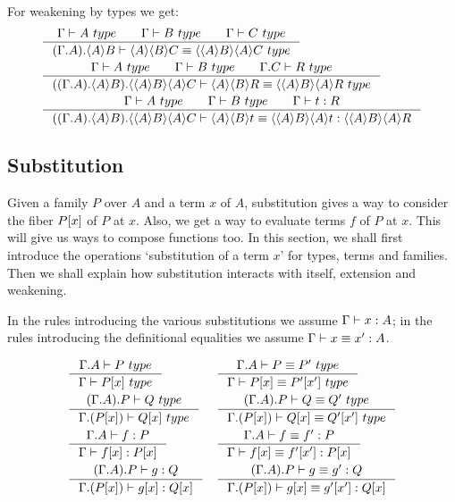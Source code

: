 For weakening by types we get:
\begin{align}
& \inference{\jtype{\Gamma}{A}\qquad\jtype{\Gamma}{B}\qquad\jtype{\Gamma}{C}}
          {\jtypeeq{\ctxext{{\Gamma}{A}}{\ctxwk{A}{B}}}{\ctxwk{A}{{B}{C}}}
            {\ctxwk{{A}{B}}{{A}{C}}}}\\
& \inference{\jtype{\Gamma}{A}\qquad\jtype{\Gamma}{B}\qquad\jtype{\ctxext{\Gamma}{C}}{R}}
          {\jtypeeq{\ctxext{{{\Gamma}{A}}{\ctxwk{A}{B}}}{\ctxwk{{A}{B}}{{A}{C}}}}
            {\ctxwk{A}{{B}{R}}}
            {\ctxwk{{A}{B}}{{A}{R}}}}\\
& \inference{\jtype{\Gamma}{A}\qquad\jtype{\Gamma}{B}\qquad\jterm{\Gamma}{R}{t}}
          {\jtermeq{\ctxext{{{\Gamma}{A}}{\ctxwk{A}{B}}}{\ctxwk{{A}{B}}{{A}{C}}}}
            {\ctxwk{{A}{B}}{{A}{R}}}{\ctxwk{A}{{B}{t}}}{\ctxwk{{A}{B}}{{A}{t}}}}
\end{align}

\subsection{Substitution}
Given a family $P$ over $A$ and a term $x$ of $A$, substitution gives a way to
consider the fiber $\subst{x}{P}$ of $P$ at $x$. Also, we get a way to evaluate
terms $f$ of $P$ at $x$. This will give us ways to compose functions too. In
this section, we shall first introduce the operations `substitution of a term $x$'
for types, terms and families. Then we shall explain how substitution interacts
with itself, extension and weakening.

In the rules introducing the various substitutions we assume $\jterm{\Gamma}{A}{x}$;
in the rules introducing the definitional equalities we assume $\jtermeq{\Gamma}{A}{x}{x'}$.

\begin{align}
& \inference{\jtype{\ctxext{\Gamma}{A}}{P}}{\jtype{\Gamma}{\subst{x}{P}}}
& & \inference{\jtypeeq{\ctxext{\Gamma}{A}}{P}{P'}}{\jtypeeq{\Gamma}{\subst{x}{P}}{\subst{x'}{P'}}}\\
& \inference{\jtype{\ctxext{{\Gamma}{A}}{P}}{Q}}{\jtype{\ctxext{\Gamma}{\subst{x}{P}}}{\subst{x}{Q}}}
& & \inference{\jtypeeq{\ctxext{{\Gamma}{A}}{P}}{Q}{Q'}}{\jtypeeq{\ctxext{\Gamma}{\subst{x}{P}}}{\subst{x}{Q}}{\subst{x'}{Q'}}}\\
& \inference{\jterm{\ctxext{\Gamma}{A}}{P}{f}}{\jterm{\Gamma}{\subst{x}{P}}{\subst{x}{f}}}
& & \inference{\jtermeq{\ctxext{\Gamma}{A}}{P}{f}{f'}}{\jtermeq{\Gamma}{\subst{x}{P}}{\subst{x}{f}}{\subst{x'}{f'}}}\\
& \inference{\jterm{\ctxext{{\Gamma}{A}}{P}}{Q}{g}}{\jterm{\ctxext{\Gamma}{\subst{x}{P}}}{\subst{x}{Q}}{\subst{x}{g}}}
& &\inference{\jtermeq{\ctxext{{\Gamma}{A}}{P}}{Q}{g}{g'}}{\jtermeq{\ctxext{\Gamma}{\subst{x}{P}}}{\subst{x}{Q}}{\subst{x}{g}}{\subst{x'}{g'}}}
\end{align}

